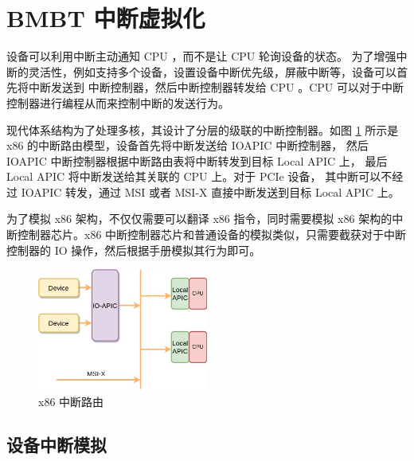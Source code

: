 \section{BMBT 中断虚拟化}\label{section:bmbt:interrupt}
设备可以利用中断主动通知 CPU ，而不是让 CPU 轮询设备的状态。
为了增强中断的灵活性，例如支持多个设备，设置设备中断优先级，屏蔽中断等，设备可以首先将中断发送到
中断控制器，然后中断控制器转发给 CPU 。CPU 可以对于中断控制器进行编程从而来控制中断的发送行为。

现代体系结构为了处理多核，其设计了分层的级联的中断控制器。如图 \ref{fig:x86-intc} 所示是 x86 的中断路由模型，设备首先将中断发送给 IOAPIC 中断控制器，
然后 IOAPIC 中断控制器根据中断路由表将中断转发到目标 Local APIC 上，
最后 Local APIC 将中断发送给其关联的 CPU 上。对于 PCIe 设备，
其中断可以不经过 IOAPIC 转发，通过 MSI 或者 MSI-X 直接中断发送到目标 Local APIC 上。

为了模拟 x86 架构，不仅仅需要可以翻译 x86 指令，同时需要模拟 x86 架构的中断控制器芯片。x86 中断控制器芯片和普通设备的模拟类似，只需要截获对于中断控制器的 IO 操作，然后根据手册模拟其行为即可。

\begin{figure}[!htbp]
	\centering
	\includegraphics[width=0.5\textwidth]{./images/x86-intc.jpg}
	\caption{x86 中断路由}
	\label{fig:x86-intc}
\end{figure}

\subsection{设备中断模拟}

